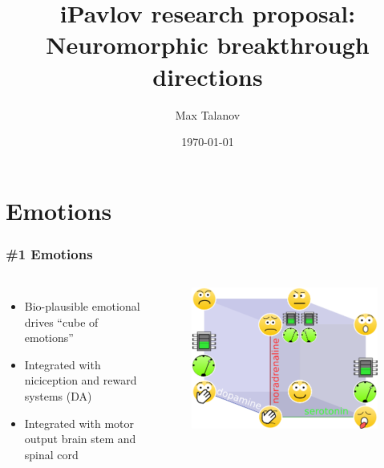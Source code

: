 \documentclass[12pt, aspectratio=169]{beamer}
\title[HSE research proposal]{iPavlov research proposal: \\Neuromorphic breakthrough directions} %
\author[Max Talanov]{
  Max Talanov
}
\institute[for: iPavlov] %
{
for iPavlov \\ %
\medskip
\textit{max.talanov@gmail.com} %
}
\date{\today} %
\begin{document}
\begin{frame}
\titlepage %
\end{frame}



\section{Emotions}

\begin{frame}
\frametitle{\#1 Emotions}
\begin{columns}[c] %


\begin{itemize}
\item Bio-plausible emotional drives ``cube of emotions''
\item Integrated with niciception and reward systems (DA)
\item Integrated with motor output brain stem and spinal cord
\end{itemize}

\begin{figure}
\includegraphics[width=0.8\linewidth]{cube_of_emotional_parameters_machine}
\end{figure}
\end{columns}
\end{frame}
\end{document}
